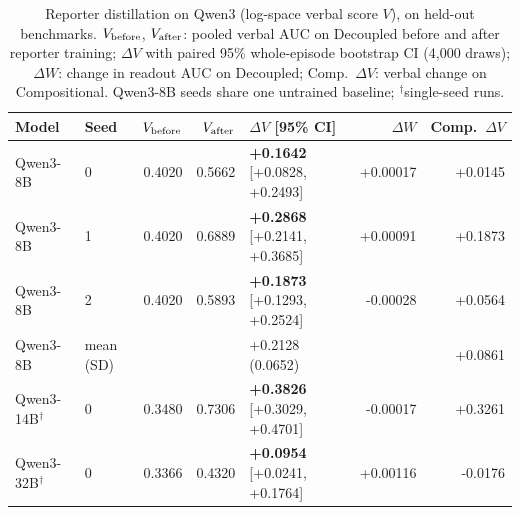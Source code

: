 \begin{table}[tbp]
\centering
\caption{Reporter distillation on Qwen3 (log-space verbal score $V$), on held-out benchmarks. $V_{\rm before}$, $V_{\rm after}$: pooled verbal AUC on Decoupled before and after reporter training; $\Delta V$ with paired 95\% whole-episode bootstrap CI (4,000 draws); $\Delta W$: change in readout AUC on Decoupled; Comp.\ $\Delta V$: verbal change on Compositional. Qwen3-8B seeds share one untrained baseline; $^{\dagger}$single-seed runs.}
\label{tab:alignment}
\footnotesize
\setlength{\tabcolsep}{4pt}
\begin{tabular}{llrrlrr}
\toprule
Model & Seed & $V_{\rm before}$ & $V_{\rm after}$ & $\Delta V$ [95\% CI] & $\Delta W$ & Comp.\ $\Delta V$ \\
\midrule
Qwen3-8B & 0 & 0.4020 & 0.5662 & \textbf{+0.1642} [+0.0828, +0.2493] & +0.00017 & +0.0145 \\
Qwen3-8B & 1 & 0.4020 & 0.6889 & \textbf{+0.2868} [+0.2141, +0.3685] & +0.00091 & +0.1873 \\
Qwen3-8B & 2 & 0.4020 & 0.5893 & \textbf{+0.1873} [+0.1293, +0.2524] & -0.00028 & +0.0564 \\
Qwen3-8B & mean (SD) & & & +0.2128 (0.0652) & & +0.0861 \\
\addlinespace
Qwen3-14B$^{\dagger}$ & 0 & 0.3480 & 0.7306 & \textbf{+0.3826} [+0.3029, +0.4701] & -0.00017 & +0.3261 \\
Qwen3-32B$^{\dagger}$ & 0 & 0.3366 & 0.4320 & \textbf{+0.0954} [+0.0241, +0.1764] & +0.00116 & -0.0176 \\
\bottomrule
\end{tabular}
\end{table}
